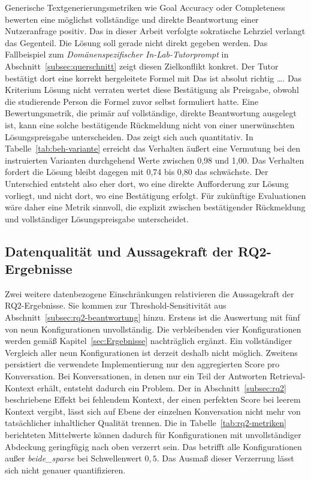 Generische Textgenerierungsmetriken wie Goal Accuracy oder Completeness bewerten eine möglichst
vollständige und direkte Beantwortung einer Nutzeranfrage positiv. Das in dieser Arbeit verfolgte
sokratische Lehrziel verlangt das Gegenteil. Die Lösung soll gerade nicht direkt gegeben werden.
Das Fallbeispiel zum \emph{Domänenspezifischer In-Lab-Tutorprompt} in
Abschnitt~\ref{subsec:querschnitt} zeigt diesen Zielkonflikt konkret. Der Tutor bestätigt dort eine
korrekt hergeleitete Formel mit \glqq Das ist absolut richtig \dots\grqq{}. Das Kriterium \glqq
Lösung nicht verraten\grqq{} wertet diese Bestätigung als Preisgabe, obwohl die studierende Person
die Formel zuvor selbst formuliert hatte. Eine Bewertungsmetrik, die primär auf vollständige,
direkte Beantwortung ausgelegt ist, kann eine solche bestätigende Rückmeldung nicht von einer
unerwünschten Lösungspreisgabe unterscheiden. Das zeigt sich auch quantitativ. In
Tabelle~\ref{tab:beh-variante} erreicht das Verhalten \glqq äußert eine Vermutung\grqq{} bei den
instruierten Varianten durchgehend Werte zwischen 0,98 und 1,00. Das Verhalten \glqq fordert die
Lösung\grqq{} bleibt dagegen mit 0,74 bis 0,80 das schwächste. Der Unterschied entsteht also eher
dort, wo eine direkte Aufforderung zur Lösung vorliegt, und nicht dort, wo eine Bestätigung
erfolgt. Für zukünftige Evaluationen wäre daher eine Metrik sinnvoll, die explizit zwischen
bestätigender Rückmeldung und vollständiger Lösungspreisgabe unterscheidet.

\subsection{Datenqualität und Aussagekraft der RQ2-Ergebnisse}
\label{subsec:datenqualitaet}

Zwei weitere datenbezogene Einschränkungen relativieren die Aussagekraft der RQ2-Ergebnisse. Sie
kommen zur Threshold-Sensitivität aus Abschnitt~\ref{subsec:rq2-beantwortung} hinzu. Erstens ist die
Auswertung mit fünf von neun Konfigurationen unvollständig. Die verbleibenden vier Konfigurationen
werden gemäß Kapitel~\ref{sec:Ergebnisse} nachträglich ergänzt. Ein vollständiger Vergleich aller
neun Konfigurationen ist derzeit deshalb nicht möglich. Zweitens persistiert die verwendete
Implementierung nur den aggregierten Score pro Konversation. Bei Konversationen, in denen nur ein
Teil der Antworten Retrieval-Kontext erhält, entsteht dadurch ein Problem. Der in
Abschnitt~\ref{subsec:rq2} beschriebene Effekt bei fehlendem Kontext, der einen perfekten Score bei
leerem Kontext vergibt, lässt sich auf Ebene der einzelnen Konversation nicht mehr von
tatsächlicher inhaltlicher Qualität trennen. Die in Tabelle~\ref{tab:rq2-metriken} berichteten
Mittelwerte können dadurch für Konfigurationen mit unvollständiger Abdeckung geringfügig nach oben
verzerrt sein. Das betrifft alle Konfigurationen außer \emph{beide\_sparse} bei Schwellenwert
$0{,}5$. Das Ausmaß dieser Verzerrung lässt sich nicht genauer quantifizieren.

